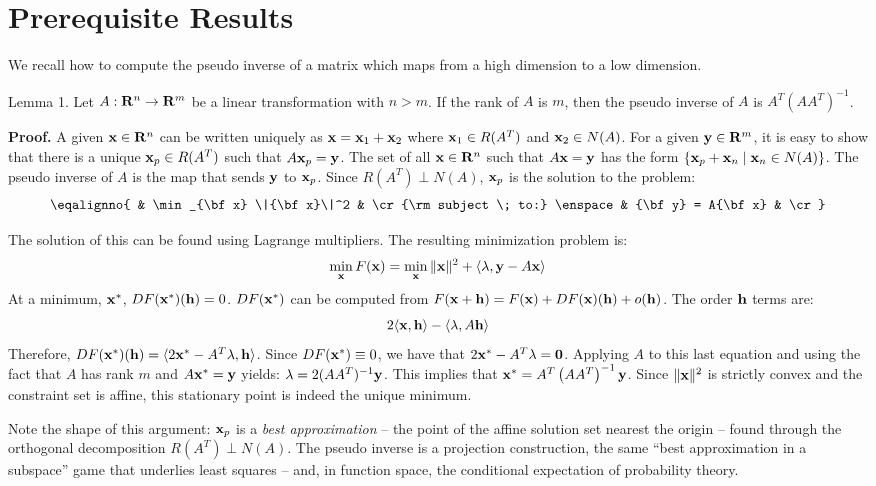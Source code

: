 \smallskip

\section{Prerequisite Results}
We recall how to compute the pseudo inverse of a matrix which maps from 
a high dimension to a low dimension.

\proclaim Lemma 1. Let $A : {\bf R}^n \to {\bf R}^m$ be a linear 
transformation with $n > m$. If the rank of $A$ is $m$, then the pseudo 
inverse of $A$ is $A^T (AA^T)^{-1}$.

{\bf Proof.} A given ${\bf x} \in {\bf R}^n$ can be written uniquely
as ${\bf x} = {\bf x}_1 + {\bf x}_2$ 
where ${\bf x}_1 \in R(A^T)$ and ${\bf x}_2 \in N(A)$. For a given 
${\bf y} \in {\bf R}^m$, it is easy to show that there is a unique 
${\bf x}_p \in R(A^T)$ such that 
$A {\bf x}_p = {\bf y}$. The set of all ${\bf x} \in {\bf R}^n$ such that 
$A{\bf x} = {\bf y}$ has the form 
$\{ {\bf x}_p + {\bf x}_n \mid {\bf x}_n \in N(A)\}$. The pseudo inverse of $A$
is the map that sends ${\bf y}$ to ${\bf x}_p$. Since $R(A^T) \perp N(A)$, ${\bf x}_p$ is the
solution to the problem:
$$
\eqalignno{
& \min_{\bf x} \|{\bf x}\|^2 & \cr
{\rm subject \; to:} \enspace & {\bf y} = A{\bf x} & \cr
}
$$

The solution of this can be found using Lagrange multipliers. The resulting
minimization problem is:
$$
\min_{\bf x} F({\bf x}) = \min_{\bf x} \|{\bf x}\|^2 + \langle\lambda, {\bf y} - A{\bf x}\rangle
$$
At a minimum, ${\bf x}^*$, $DF({\bf x}^*) ({\bf h}) = 0$. 
$DF({\bf x}^*)$ 
can be computed from 
$F({\bf x} + {\bf h}) = F({\bf x}) + DF({\bf x})({\bf h}) + o({\bf h})$. The order 
${\bf h}$ terms are:
$$
2\langle{\bf x}, {\bf h}\rangle - \langle\lambda, A{\bf h}\rangle
$$
Therefore, $DF({\bf x}^*)({\bf h}) =
\langle 2 {\bf x}^* - A^T \lambda, {\bf h}\rangle$. Since $DF({\bf x}^*) \equiv 0$, we
have that $2 {\bf x}^* - A^T \lambda = {\bf 0}$. Applying $A$ to this 
last equation and using the fact that $A$ has rank $m$ and  
$A{\bf x}^* = {\bf y}$ yields:%
$\lambda = 2 (A A^T)^{-1} {\bf y}$.
This implies that ${\bf x}^* = A^T \left(A A^T\right)^{-1} {\bf y}$.
Since $\|{\bf x}\|^2$ is strictly convex and the constraint set is affine,
this stationary point is indeed the unique minimum.

Note the shape of this argument: ${\bf x}_p$ is a {\it best
approximation\/} -- the point of the affine solution set nearest the
origin -- found through the orthogonal decomposition
$R(A^T) \perp N(A)$. The pseudo inverse is a projection construction, the
same ``best approximation in a subspace'' game that underlies least
squares -- and, in function space, the conditional expectation of
probability theory.

